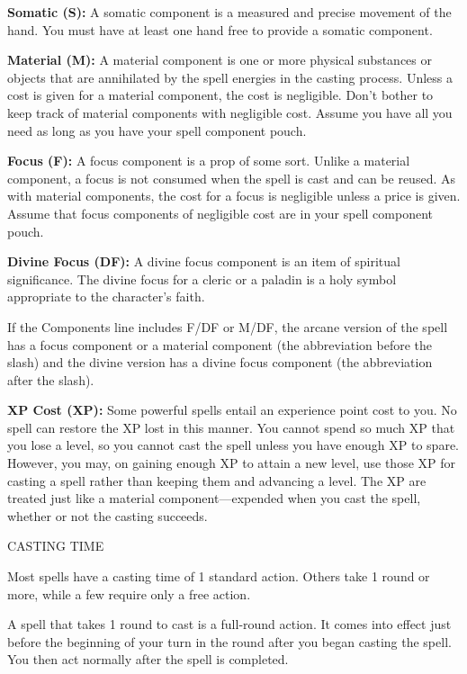\documentclass{article}
\begin{document}
\textbf{Somatic (S):} A somatic component is a measured and precise movement of 
the hand. You must have at least one hand free to provide a somatic component.

\textbf{Material (M):} A material component is one or more physical substances 
or objects that are annihilated by the spell energies in the casting process. Unless 
a cost is given for a material component, the cost is negligible. Don't bother 
to keep track of material components with negligible cost. Assume you have all 
you need as long as you have your spell component pouch.

\textbf{Focus (F): }A focus component is a prop of some sort. Unlike a material 
component, a focus is not consumed when the spell is cast and can be reused. As 
with material components, the cost for a focus is negligible unless a price is 
given. Assume that focus components of negligible cost are in your spell component 
pouch.

\textbf{Divine Focus (DF):} A divine focus component is an item of spiritual significance. 
The divine focus for a cleric or a paladin is a holy symbol appropriate to the 
character's faith. 

If the Components line includes F/DF or M/DF, the arcane version of the spell has 
a focus component or a material component (the abbreviation before the slash) and 
the divine version has a divine focus component (the abbreviation after the slash).

\textbf{XP Cost (XP):} Some powerful spells entail an experience point cost to 
you. No spell can restore the XP lost in this manner. You cannot spend so much 
XP that you lose a level, so you cannot cast the spell unless you have enough XP 
to spare. However, you may, on gaining enough XP to attain a new level, use those 
XP for casting a spell rather than keeping them and advancing a level. The XP are 
treated just like a material component---expended when you cast the spell, whether 
or not the casting succeeds.

\vspace{12pt}
CASTING TIME

Most spells have a casting time of 1 standard action. Others take 1 round or more, 
while a few require only a free action.

A spell that takes 1 round to cast is a full-round action. It comes into effect 
just before the beginning of your turn in the round after you began casting the 
spell. You then act normally after the spell is completed.
\end{document}
